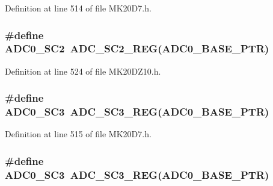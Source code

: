 Definition at line 514 of file M\+K20\+D7.\+h.

\subsubsection[{\texorpdfstring{A\+D\+C0\+\_\+\+S\+C2}{ADC0_SC2}}]{\setlength{\rightskip}{0pt plus 5cm}\#define A\+D\+C0\+\_\+\+S\+C2~{\bf A\+D\+C\+\_\+\+S\+C2\+\_\+\+R\+EG}({\bf A\+D\+C0\+\_\+\+B\+A\+S\+E\+\_\+\+P\+TR})}\hypertarget{group___a_d_c___register___accessor___macros_gaecf9cc86d430a0b004e90ad7baec3fd2}{}\label{group___a_d_c___register___accessor___macros_gaecf9cc86d430a0b004e90ad7baec3fd2}


Definition at line 524 of file M\+K20\+D\+Z10.\+h.

\subsubsection[{\texorpdfstring{A\+D\+C0\+\_\+\+S\+C3}{ADC0_SC3}}]{\setlength{\rightskip}{0pt plus 5cm}\#define A\+D\+C0\+\_\+\+S\+C3~{\bf A\+D\+C\+\_\+\+S\+C3\+\_\+\+R\+EG}({\bf A\+D\+C0\+\_\+\+B\+A\+S\+E\+\_\+\+P\+TR})}\hypertarget{group___a_d_c___register___accessor___macros_ga616f246beb053dd75afc845afb200c4c}{}\label{group___a_d_c___register___accessor___macros_ga616f246beb053dd75afc845afb200c4c}


Definition at line 515 of file M\+K20\+D7.\+h.

\subsubsection[{\texorpdfstring{A\+D\+C0\+\_\+\+S\+C3}{ADC0_SC3}}]{\setlength{\rightskip}{0pt plus 5cm}\#define A\+D\+C0\+\_\+\+S\+C3~{\bf A\+D\+C\+\_\+\+S\+C3\+\_\+\+R\+EG}({\bf A\+D\+C0\+\_\+\+B\+A\+S\+E\+\_\+\+P\+TR})}\hypertarget{group___a_d_c___register___accessor___macros_ga616f246beb053dd75afc845afb200c4c}{}\label{group___a_d_c___register___accessor___macros_ga616f246beb053dd75afc845afb200c4c}


